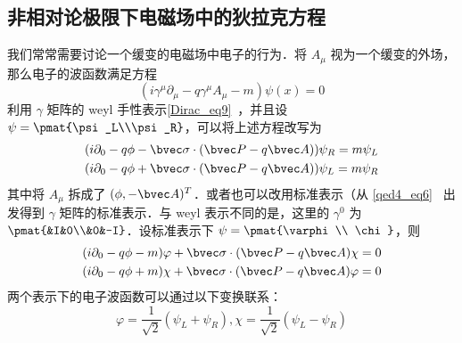\subsection{非相对论极限下电磁场中的狄拉克方程}
我们常常需要讨论一个缓变的电磁场中电子的行为．将 $A_\mu$ 视为一个缓变的外场，那么电子的波函数满足方程
\begin{equation}
(i\gamma^\mu \partial_\mu -q\gamma^\mu A_\mu - m)\psi(x)=0
\end{equation}
利用 $\gamma$ 矩阵的 weyl 手性表示\autoref{Dirac_eq9}~，并且设 $\psi = \pmat{\psi_L\\\psi_R}$，可以将上述方程改写为
\begin{equation}
\begin{aligned}
&(i\partial_0 - q\phi-\bvec \sigma\cdot (\bvec P-q\bvec A))\psi_R=m\psi_L\\
&(i\partial_0-q\phi+\bvec \sigma\cdot (\bvec P-q\bvec A))\psi_L = m\psi_R
\end{aligned}
\end{equation}
其中将 $A_\mu$ 拆成了 $(\phi,-\bvec A)^T$．或者也可以改用标准表示（从 \autoref{qed4_eq6}~ 出发得到 $\gamma$ 矩阵的标准表示．与 weyl 表示不同的是，这里的 $\gamma^0$ 为 $\pmat{&I&0\\&0&-I}$．设标准表示下 $\psi=\pmat{\varphi\\ \chi}$，则
\begin{equation}\label{DiracE_eq1}
\begin{aligned}
&(i\partial_0-q\phi-m)\varphi+\bvec \sigma\cdot (\bvec P-q\bvec A)\chi=0\\
&(i\partial_0-q\phi+m)\chi+\bvec \sigma\cdot (\bvec P-q\bvec A)\varphi=0
\end{aligned}
\end{equation}
两个表示下的电子波函数可以通过以下变换联系：
\begin{equation}
\varphi = \frac{1}{\sqrt{2}}(\psi_L+\psi_R),\chi = \frac{1}{\sqrt{2}}(\psi_L-\psi_R)
\end{equation}

